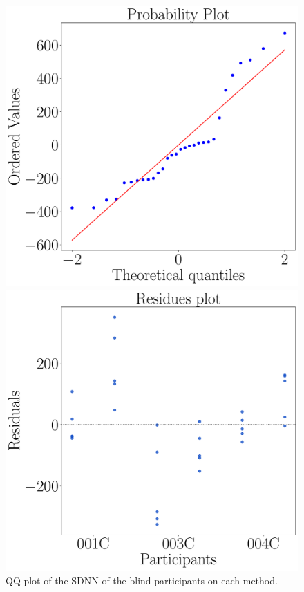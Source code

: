 \begin{figure}[!htb]
    \centering
    \begin{minipage}{0.45\textwidth}
        \centering
        \includegraphics[width = \textwidth]{Resultados/GSR/Figuras/pdf/qqplot_gsr_two_way_blind.pdf}
        \caption{QQ plot of the SDNN of the blind participants on each method.}
        \label{fig:qqplot_gsr_two_way_blind}
    \end{minipage}
    \begin{minipage}{0.075\textwidth}
        \hfill
    \end{minipage}
    \begin{minipage}{0.45\textwidth}
        \centering
        \includegraphics[width = \textwidth]{Resultados/GSR/Figuras/pdf/residplot_gsr_two_way_blind.pdf}

\end{minipage}
\end{figure}
